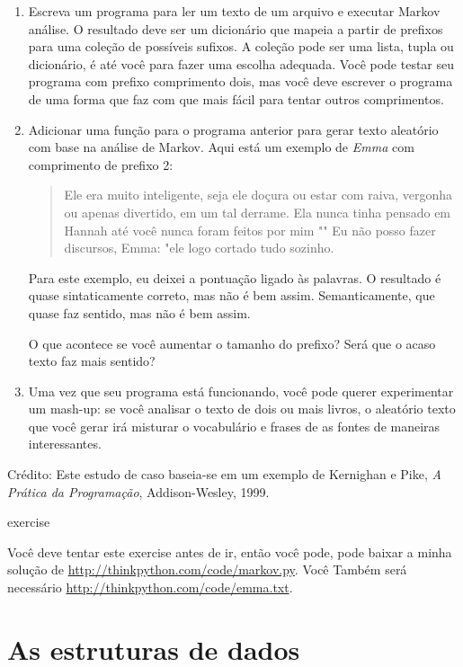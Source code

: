 \documentclass[10pt]{book}
\begin{document}
\begin{exercise}
\begin{v erbatim}
\begin{}
\begin{enumerate}
\item Escreva um programa para ler um texto de um arquivo e executar Markov
análise. O resultado deve ser um dicionário que mapeia a partir de
prefixos para uma coleção de possíveis sufixos. A coleção
pode ser uma lista, tupla ou dicionário, é até você para fazer
uma escolha adequada. Você pode testar seu programa com prefixo
comprimento dois, mas você deve escrever o programa de uma forma que faz com que
mais fácil para tentar outros comprimentos.

\item Adicionar uma função para o programa anterior para gerar texto aleatório
com base na análise de Markov. Aqui está um exemplo de {\em Emma}
com comprimento de prefixo 2:

\begin{quote}
Ele era muito inteligente, seja ele doçura ou estar com raiva, vergonha ou apenas
divertido, em um tal derrame. Ela nunca tinha pensado em Hannah até você
nunca foram feitos por mim "" Eu não posso fazer discursos, Emma: "ele logo cortado
tudo sozinho.
\end{quote}

Para este exemplo, eu deixei a pontuação ligado às palavras.
O resultado é quase sintaticamente correto, mas não é bem assim.
Semanticamente, que quase faz sentido, mas não é bem assim.

O que acontece se você aumentar o tamanho do prefixo? Será que o acaso
texto faz mais sentido?

\item Uma vez que seu programa está funcionando, você pode querer experimentar um mash-up:
se você analisar o texto de dois ou mais livros, o aleatório
texto que você gerar irá misturar o vocabulário e frases de
as fontes de maneiras interessantes.

\end{enumerate}

Crédito: Este estudo de caso baseia-se em um exemplo de Kernighan e
Pike, {\em A Prática da Programação}, Addison-Wesley, 1999.

\end{} exercise

Você deve tentar este exercise antes de ir, então você pode, pode
baixar a minha solução de \url{http://thinkpython.com/code/markov.py}. Você
Também será necessário \url{http://thinkpython.com/code/emma.txt}.


\section{As estruturas de dados}


\end{v erbatim}
\end{exercise}
\end{document}
